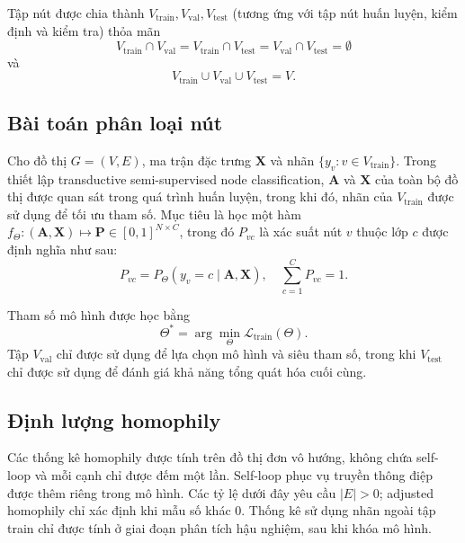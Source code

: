 \documentclass[12pt,a4paper]{article}
\numberwithin{equation}{section}
\theoremstyle{definition}
\begin{document}
Tập nút được chia thành $V_{\text{train}}, V_{\text{val}}, V_{\text{test}}$ (tương ứng với tập nút huấn luyện, kiểm định và kiểm tra) thỏa mãn
\begin{equation}
V_{\text{train}} \cap V_{\text{val}} = V_{\text{train}} \cap V_{\text{test}} = V_{\text{val}} \cap V_{\text{test}} = \emptyset
\end{equation}
và
\begin{equation}
V_{\text{train}} \cup V_{\text{val}} \cup V_{\text{test}} = V.
\end{equation}

\subsection{Bài toán phân loại nút}
Cho đồ thị $G = (V, E)$, ma trận đặc trưng $\mathbf{X}$ và nhãn $\{y_v : v \in V_{\text{train}}\}$. Trong thiết lập transductive semi-supervised node classification, $\mathbf{A}$ và $\mathbf{X}$ của toàn bộ đồ thị được quan sát trong quá trình huấn luyện, trong khi đó, nhãn của $V_{\text{train}}$ được sử dụng để tối ưu tham số. Mục tiêu là học một hàm $f_\Theta : (\mathbf{A}, \mathbf{X}) \mapsto \mathbf{P} \in [0, 1]^{N \times C}$, trong đó $P_{vc}$ là xác suất nút $v$ thuộc lớp $c$ được định nghĩa như sau:
\begin{equation}
P_{vc} = P_\Theta(y_v = c \mid \mathbf{A}, \mathbf{X}), \quad \sum_{c=1}^C P_{vc} = 1.
\end{equation}

Tham số mô hình được học bằng
\begin{equation}
\Theta^* = \arg\min_\Theta \mathcal{L}_{\text{train}}(\Theta).
\end{equation}
Tập $V_{\text{val}}$ chỉ được sử dụng để lựa chọn mô hình và siêu tham số, trong khi $V_{\text{test}}$ chỉ được sử dụng để đánh giá khả năng tổng quát hóa cuối cùng.

\subsection{Định lượng homophily}

Các thống kê homophily được tính trên đồ thị đơn vô hướng, không chứa self-loop và mỗi cạnh chỉ được đếm một lần. Self-loop phục vụ truyền thông điệp được thêm riêng trong mô hình. Các tỷ lệ dưới đây yêu cầu $|E|>0$; adjusted homophily chỉ xác định khi mẫu số khác $0$. Thống kê sử dụng nhãn ngoài tập train chỉ được tính ở giai đoạn phân tích hậu nghiệm, sau khi khóa mô hình.
\end{document}
